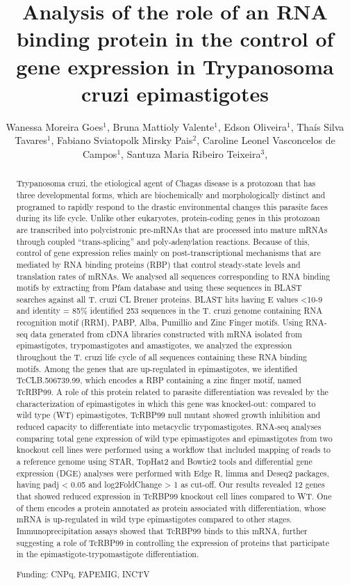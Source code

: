 \documentclass[twoside]{article}
\title{\vspace{-15mm}\fontsize{24pt}{10pt}\selectfont\textbf{ Analysis of the role of an RNA binding protein in the control of gene expression in Trypanosoma cruzi epimastigotes }} %
\author{ Wanessa Moreira Goes$^{1}$, Bruna Mattioly Valente$^{1}$, Edson Oliveira$^{1}$, Thaís Silva Tavares$^{1}$, Fabiano Sviatopolk Mirsky Pais$^{2}$, Caroline Leonel Vasconcelos de Campos$^{1}$, Santuza Maria Ribeiro Teixeira$^{3}$, }
\affil{ 1 Universidade Federal de Minas Gerais

2 Centro de Pesquisa René Rachou, FIOCRUZ

3 Institute of Biological Sciences, UFMG

 }
\date{}
\begin{document}
  
  
  \maketitle %
  
  
  \thispagestyle{fancy} %
  
  
  \begin{abstract}
  Trypanosoma cruzi, the etiological agent of Chagas disease is a protozoan that has three developmental forms, which are biochemically and morphologically distinct and programed to rapidly respond to the drastic environmental changes this parasite faces during its life cycle. Unlike other eukaryotes, protein-coding genes in this protozoan are transcribed into polycistronic pre-mRNAs that are processed into mature mRNAs through coupled “trans-splicing” and poly-adenylation reactions. Because of this, control of gene expression relies mainly on post-transcriptional mechanisms that are mediated by RNA binding proteins (RBP) that control steady-state levels and translation rates of mRNAs. We analysed all sequences corresponding to RNA binding motifs by extracting from Pfam database and using these sequences in BLAST searches against all T. cruzi CL Brener proteins. BLAST hits having E values <10-9 and identity = 85\% identified 253 sequences in the T. cruzi genome containing RNA recognition motif (RRM), PABP, Alba, Pumillio and Zinc Finger motifs. Using RNA-seq data generated from cDNA libraries constructed with mRNA isolated from epimastigotes, trypomastigotes and amastigotes, we analyzed the expression throughout the T. cruzi life cycle of all sequences containing these RNA binding motifs. Among the genes that are up-regulated in epimastigotes, we identified TcCLB.506739.99, which encodes a RBP containing a zinc finger motif, named TcRBP99. A role of this protein related to parasite differentiation was revealed by the characterization of epimastigotes in which this gene was knocked-out: compared to wild type (WT) epimastigotes, TcRBP99 null mutant showed growth inhibition and reduced capacity to differentiate into metacyclic trypomastigotes. RNA-seq analyses comparing total gene expression of wild type epimastigotes and epimastigotes from two knockout cell lines were performed using a workflow that included mapping of reads to a reference genome using STAR, TopHat2 and Bowtie2 tools and differential gene expression (DGE) analyses were performed with Edge R, limma and Deseq2 packages, having padj < 0.05 and log2FoldChange > 1 as cut-off. Our results revealed 12 genes that showed reduced expression in TcRBP99 knockout cell lines compared to WT. One of them encodes a protein annotated as protein associated with differentiation, whose mRNA is up-regulated in wild type epimastigotes compared to other stages. Immunoprecipitation assays showed that TcRBP99 binds to this mRNA, further suggesting a role of TcRBP99 in controlling the expression of proteins that participate in the epimastigote-trypomastigote differentiation.
  
  Funding: CNPq, FAPEMIG, INCTV \\ 
  \end{abstract}
  
\end{document}
